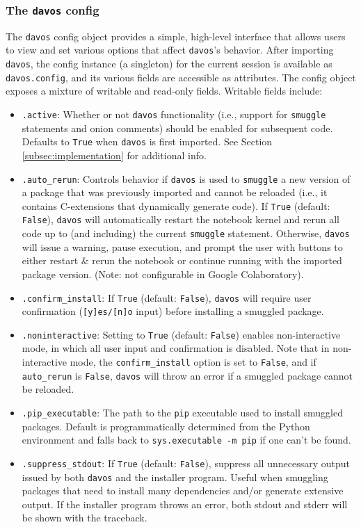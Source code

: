 \documentclass[preprint,12pt,a4paper]{elsarticle}
\begin{document}
\subsubsection{The \texttt{davos} config}\label{subsec:config}
The \texttt{davos} config object provides a simple, high-level interface that allows users to view and set various options that affect \texttt{davos}'s behavior. After importing \texttt{davos}, the config instance (a singleton) for the current session is available as \texttt{davos.config}, and its various fields are accessible as attributes. The config object exposes a mixture of writable and read-only fields. Writable fields include:
\begin{itemize}
\item \texttt{.active}: Whether or not \texttt{davos} functionality (i.e., support for \texttt{smuggle} statements and onion comments) should be enabled for subsequent code. Defaults to \texttt{True} when \texttt{davos} is first imported. See Section \ref{subsec:implementation} for additional info.
\item \texttt{.auto\_rerun}: Controls behavior if \texttt{davos} is used to \texttt{smuggle} a new version of a package that was previously imported and cannot be reloaded (i.e., it contains C-extensions that dynamically generate code). If \texttt{True} (default: \texttt{False}), \texttt{davos} will automatically restart the notebook kernel and rerun all code up to (and including) the current \texttt{smuggle} statement. Otherwise, \texttt{davos} will issue a warning, pause execution, and prompt the user with buttons to either restart \& rerun the notebook or continue running with the imported package version. (Note: not configurable in Google Colaboratory).
\item \texttt{.confirm\_install}: If \texttt{True} (default: \texttt{False}), \texttt{davos} will require user confirmation (\texttt{[y]es/[n]o} input) before installing a smuggled package.
\item \texttt{.noninteractive}: Setting to \texttt{True} (default: \texttt{False}) enables non-interactive mode, in which all user input and confirmation is disabled. Note that in non-interactive mode, the \texttt{confirm\_install} option is set to \texttt{False}, and if \texttt{auto\_rerun} is \texttt{False}, \texttt{davos} will throw an error if a smuggled package cannot be reloaded.
\item \texttt{.pip\_executable}: The path to the \texttt{pip} executable used to install smuggled packages. Default is programmatically determined from the Python environment and falls back to \texttt{sys.executable -m pip} if one can't be found.
\item \texttt{.suppress\_stdout}: If \texttt{True} (default: \texttt{False}), suppress all unnecessary output issued by both \texttt{davos} and the installer program. Useful when smuggling packages that need to install many dependencies and/or generate extensive output. If the installer program throws an error, both stdout and stderr will be shown with the traceback.
\end{itemize}
\end{document}
